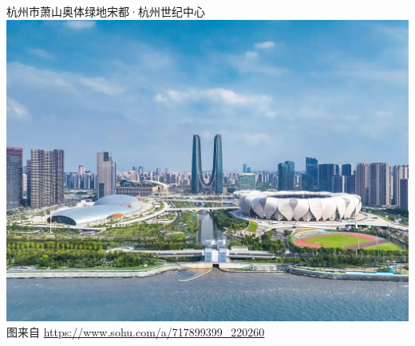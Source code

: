\documentclass[t]{ctexbeamer}
\begin{document}
\begin{frame}
\begin{columns}[T]
\end{columns}

\begin{block}{杭州市萧山奥体绿地宋都·杭州世纪中心}
\smallskip
\centering
\includegraphics[width=\textwidth,clip,trim=0pt 2cm 0pt 8cm,]{hangzhou-arch.jpg}\\
图来自 \url{https://www.sohu.com/a/717899399_220260}
\end{block}


\begin{block}{\refname}
\renewcommand*{\bibfont}{\small\linespread{1}\selectfont}
\setlength{\biblabelsep}{0.25em}
\printbibliography[heading=none]
\end{block}

\end{frame}
\end{document}
